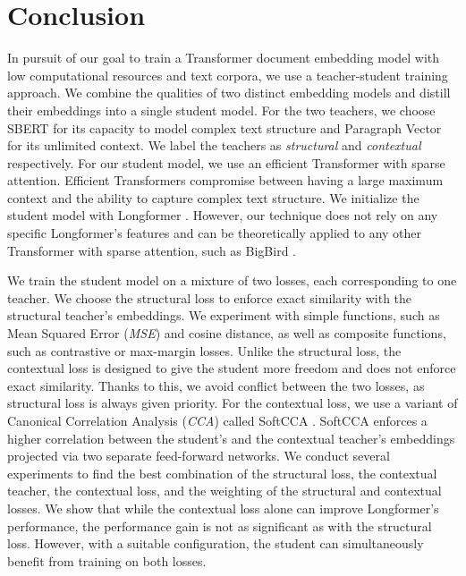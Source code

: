 \chapter*{Conclusion}

In pursuit of our goal to train a Transformer document embedding model with low
computational resources and text corpora, we use a teacher-student training
approach. We combine the qualities of two distinct embedding models and distill
their embeddings into a single student model. For the two teachers, we choose
SBERT \citep{reimers2019sentence} for its capacity to model complex text
structure and Paragraph Vector \citep{le2014distributed} for its unlimited
context. We label the teachers as \emph{structural} and \emph{contextual}
respectively. For our student model, we use an efficient Transformer with
sparse attention. Efficient Transformers compromise between having a large
maximum context and the ability to capture complex text structure. We
initialize the student model with Longformer \citep{beltagy2020longformer}.
However, our technique does not rely on any specific Longformer's features and
can be theoretically applied to any other Transformer with sparse attention,
such as BigBird \citep{zaheer2020big}.

We train the student model on a mixture of two losses, each corresponding to
one teacher. We choose the structural loss to enforce exact similarity with the
structural teacher's embeddings. We experiment with simple functions, such as
Mean Squared Error (\emph{MSE}) and cosine distance, as well as composite
functions, such as contrastive or max-margin losses. Unlike the structural
loss, the contextual loss is designed to give the student more freedom and does
not enforce exact similarity. Thanks to this, we avoid conflict between the two
losses, as structural loss is always given priority. For the contextual loss,
we use a variant of Canonical Correlation Analysis (\emph{CCA})
\citep{hotelling1992relations} called SoftCCA \citep{chen2016training}. SoftCCA
enforces a higher correlation between the student's and the contextual
teacher's embeddings projected via two separate feed-forward networks. We
conduct several experiments to find the best combination of the structural
loss, the contextual teacher, the contextual loss, and the weighting of the
structural and contextual losses. We show that while the contextual loss alone
can improve Longformer's performance, the performance gain is not as
significant as with the structural loss. However, with a suitable
configuration, the student can simultaneously benefit from training on both
losses.

